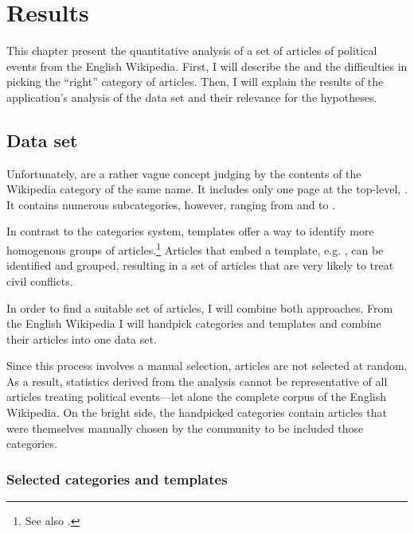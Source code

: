 \chapter{Results}\label{ch:results}

This chapter present the quantitative analysis of a set of articles of political events from the English Wikipedia.
First, I will describe the  and the difficulties in picking the ``right'' category of articles.
Then, I will explain the results of the application's analysis of the data set and their relevance for the hypotheses.

\section{Data set}\label{sec:datasets}

Unfortunately,  are a rather vague concept judging by the contents of the Wikipedia category of the same name.
It includes only one page at the top-level, .
It contains numerous subcategories, however, ranging from  and  to .

In contrast to the categories system, templates offer a way to identify more homogenous groups of articles.\footnote{See also .}
Articles that embed a template, e.g. , can be identified and grouped, resulting in a set of articles that are very likely to treat civil conflicts. 

In order to find a suitable set of articles, I will combine both approaches.
From the English Wikipedia I will handpick categories and templates and combine their articles into one data set.

Since this process involves a manual selection, articles are not selected at random.
As a result, statistics derived from the analysis cannot be representative of all articles treating political events---let alone the complete corpus of the English Wikipedia.
On the bright side, the handpicked categories contain articles that were themselves manually chosen by the community to be included those categories.

\subsection{Selected categories and templates}

